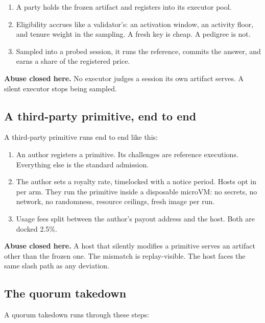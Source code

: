 \documentclass[11pt]{article}
\begin{document}
\begin{enumerate}
    \item A party holds the frozen artifact and registers into its
          executor pool.
    \item Eligibility accrues like a validator's: an activation
          window, an activity floor, and tenure weight in the sampling. A
          fresh key is cheap. A pedigree is not.
    \item Sampled into a probed session, it runs the reference,
          commits the answer, and earns a share of the registered price.
\end{enumerate}
\textbf{Abuse closed here.} No executor judges a session its own
artifact serves. A silent executor stops being sampled.

\subsection{A third-party primitive, end to end}

A third-party primitive runs end to end like this:

\begin{enumerate}
    \item An author registers a primitive. Its challenges are
          reference executions. Everything else is the standard admission.
    \item The author sets a royalty rate, timelocked with a notice
          period. Hosts opt in per arm. They run the primitive inside a
          disposable microVM: no secrets, no network, no randomness,
          resource ceilings, fresh image per run.
    \item Usage fees split between the author's payout address and
          the host. Both are docked 2.5\%.
\end{enumerate}
\textbf{Abuse closed here.} A host that silently modifies a
primitive serves an artifact other than the frozen one. The
mismatch is replay-visible. The host faces the same slash path as
any deviation.

\subsection{The quorum takedown}

A quorum takedown runs through these steps:
\end{document}

